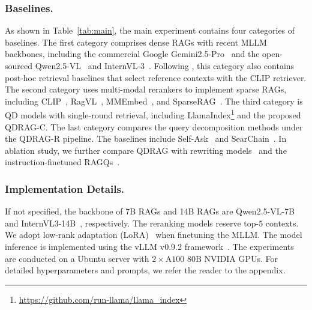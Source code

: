 \documentclass[letterpaper]{article} %
\begin{document}
\subsubsection{Baselines.} 
As shown in Table~\ref{tab:main}, the main experiment contains four categories of baselines. The first category comprises dense RAGs with recent MLLM backbones, including the commercial 
Google Gemini2.5-Pro~\cite{gemini} and the open-sourced Qwen2.5-VL~\cite{qwen2.5-VL} and InternVL-3~\cite{zhu2025internvl3}.
Following \cite{huang-etal-2024-learning}, this category also contains post-hoc retrieval baselines that select reference contexts with the CLIP retriever. The second category uses multi-modal rerankers to implement sparse RAGs, including CLIP~\cite{pmlr-v139-radford21a}, RagVL~\cite{chen2024mllmstrongrerankeradvancing}, MMEmbed~\cite{lin2025mmembed}, and SparseRAG~\cite{zhu2025accelerating}. The third category is QD models with single-round retrieval, including LlamaIndex\footnote{\url{https://github.com/run-llama/llama_index}} and the proposed QDRAG-C. The last category compares the query decomposition methods under the QDRAG-R pipeline. The baselines include Self-Ask~\cite{press-etal-2023-measuring} and SearChain~\cite{xu2024search}. In ablation study, we further compare QDRAG with rewriting models~\cite{mao-etal-2024-rafe} and the instruction-finetuned  RAGQs~\cite{huang-etal-2024-learning}. 

\vspace*{-2mm}
\subsubsection{Implementation Details.}
If not specified, the backbone of 7B RAGs and 14B RAGs are Qwen2.5-VL-7B~\cite{qwen2.5-VL} and  InternVL3-14B~\cite{zhu2025internvl3}, respectively. The reranking models reserve top-$5$ contexts. 
We adopt low-rank adaptation (LoRA)~\cite{hu2022lora} when finetuning the MLLM. 
The model inference is implemented using the vLLM v0.9.2 framework~\cite{kwon2023efficient}. The experiments are conducted on a Ubuntu server with $2\times\text{A100 80B}$ NVIDIA GPUs. For detailed hyperparameters and prompts, we refer the reader to the appendix. 
\end{document}
